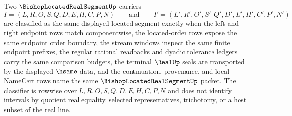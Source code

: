 \begin{definition}
\label{def:bishop-located-real-segment-classifier}
Two $\BishopLocatedRealSegmentUp$ carriers
$$
I=(L,R,O,S,Q,D,E,H,C,P,N)
\qquad\text{and}\qquad
I'=(L',R',O',S',Q',D',E',H',C',P',N')
$$
are classified as the same displayed located segment exactly when the left and right endpoint rows match componentwise, the located-order rows expose the same endpoint order boundary, the stream windows inspect the same finite endpoint prefixes, the regular rational readbacks and dyadic tolerance ledgers carry the same comparison budgets, the terminal $\RealUp$ seals are transported by the displayed $\hsame$ data, and the continuation, provenance, and local NameCert rows name the same $\BishopLocatedRealSegmentUp$ packet. The classifier is rowwise over $L,R,O,S,Q,D,E,H,C,P,N$ and does not identify intervals by quotient real equality, selected representatives, trichotomy, or a host subset of the real line.
\end{definition}

